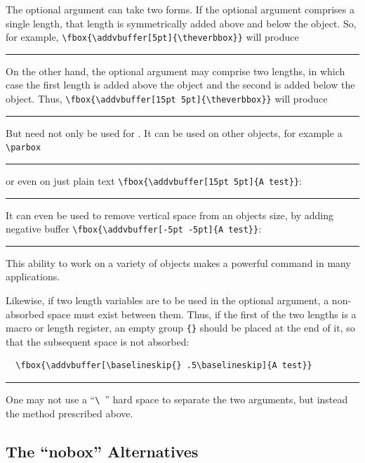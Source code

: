 \documentclass{article}
\newcommand\rl{\rule{1em}{0in}}
\begin{document}
\begin{myverbbox}{\myvb}
The optional argument can take two forms.  If the optional argument
comprises a single length, that length is symmetrically added above and
below the object.  So, for example,
  \verb|\fbox{\addvbuffer[5pt]{\theverbbox}}|
will produce

\rl\fbox{\addvbuffer[5pt]{\theverbbox}}

On the other hand, the optional argument may comprise two lengths, in
which case the first length is added above the object and the second is
added below the object.  Thus, 
\verb|\fbox{\addvbuffer[15pt 5pt]{\theverbbox}}|
will produce

\rl\fbox{\addvbuffer[15pt 5pt]{\theverbbox}}

But {\avb} need not only be used for \tvb.  It can be used on other
objects, for example a \verb|\parbox|

\rl{}

or even on just plain text \verb|\fbox{\addvbuffer[15pt 5pt]{A test}}|:

\rl{}

It can even be used to remove vertical space from an objects size, by
adding negative buffer \verb|\fbox{\addvbuffer[-5pt -5pt]{A test}}|:

\rl{}

This ability to work on a variety of objects makes {\avb} a powerful
command in many applications.

Likewise, if two length variables are to be used in the optional
argument, a non-absorbed space must exist between them. 
Thus, if the first of the two lengths is a macro or length register, 
  an empty group \verb|{}| should be placed at the end of it, so that 
  the subsequent space is not absorbed:

\begin{verbatim}
  \fbox{\addvbuffer[\baselineskip{} .5\baselineskip]{A test}}
\end{verbatim}

\rl{}

One may not use a ``\verb|\ |'' hard space to separate the
two arguments, but instead the method prescribed above.

\subsection{The ``nobox'' Alternatives}


\end{myverbbox}
\end{document}
